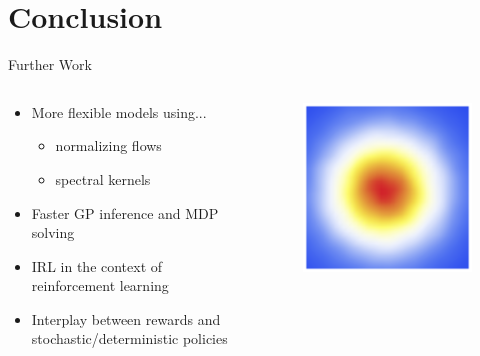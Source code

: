 \documentclass{beamer}
\begin{document}
\section{Conclusion}


\begin{frame}{Further Work}
  \begin{minipage}[t]{\textwidth}
    \begin{columns}[t]
      \begin{column}{0.9\textwidth}
        \begin{itemize}
        \item More flexible models using...
          \begin{itemize}
          \item normalizing flows
          \item spectral kernels
          \end{itemize}
        \item Faster GP inference and MDP solving
        \item IRL in the context of reinforcement learning
        \item Interplay between rewards and stochastic/deterministic policies
        \end{itemize}
        \vspace{1.5cm}
      \end{column}
      \begin{column}{0.1\textwidth}
        \vspace{-1cm}
        \begin{figure}
          \centering
          \includegraphics[scale=0.1]{images/flows-1.png}


\end{figure}
\end{column}
\end{columns}
\end{minipage}
\end{frame}
\end{document}
